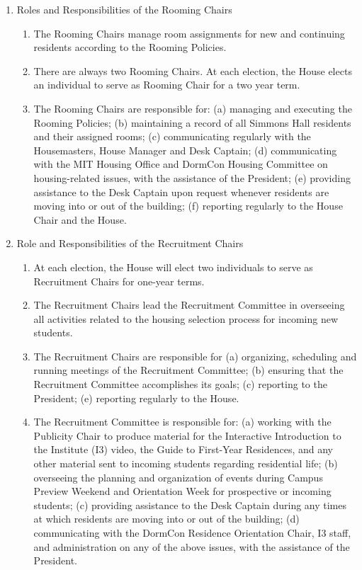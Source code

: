 \documentclass[letterpaper]{article}
\begin{document}
\begin{enumerate}
\begin{enumerate}
\begin{enumerate}
\end{enumerate}

\item Roles and Responsibilities of the Rooming Chairs

\begin{enumerate}

\item The Rooming Chairs manage room assignments for new and continuing residents according to the Rooming Policies.

\item There are always two Rooming Chairs. At each election, the House elects an individual to serve as Rooming Chair for a two year term.

\item The Rooming Chairs are responsible for: (a) managing and executing the Rooming Policies; (b) maintaining a record of all Simmons Hall residents and their assigned rooms; (c) communicating regularly with the Housemasters, House Manager and Desk Captain; (d) communicating with the MIT Housing Office and DormCon Housing Committee on housing-related issues, with the assistance of the President; (e) providing assistance to the Desk Captain upon request whenever residents are moving into or out of the building; (f) reporting regularly to the House Chair and the House.

\end{enumerate}

\item Role and Responsibilities of the Recruitment Chairs

\begin{enumerate}

\item At each election, the House will elect two individuals to serve as Recruitment Chairs for one-year terms.

\item The Recruitment Chairs lead the Recruitment Committee in overseeing all activities related to the housing selection process for incoming new students.

\item The Recruitment Chairs are responsible for (a) organizing, scheduling and running meetings of the Recruitment Committee; (b) ensuring that the Recruitment Committee accomplishes its goals; (c) reporting to the President; (e) reporting regularly to the House. \item The Recruitment Committee is responsible for: (a) working with the Publicity Chair to produce material for the Interactive Introduction to the Institute (I3) video, the Guide to First-Year Residences, and any
other material sent to incoming students regarding residential life; (b) overseeing the planning and organization of events during Campus Preview Weekend and Orientation Week for prospective or incoming students; (c) providing assistance to the Desk Captain during any times at which residents are moving into or out of the building; (d) communicating with the DormCon Residence Orientation Chair, I3 staff, and administration on any of the above issues, with the assistance of the President.


\end{enumerate}
\end{enumerate}
\end{enumerate}
\end{document}
